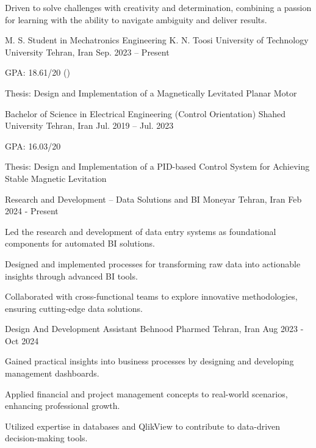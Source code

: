\documentclass[11pt, a4paper]{awesome-cv}
\begin{document}
	
	\makecvheader[C]
	
Driven to solve challenges with creativity and determination, combining a passion for learning with the ability to navigate ambiguity and deliver results.
	
\begin{cventries}
	\cventry
	{M. S. Student in Mechatronics Engineering} %
	{K. N. Toosi University of Technology University} %
	{Tehran, Iran} %
	{Sep. 2023 -- Present} %
	{
		\begin{cvitems} %
			\item {GPA: 18.61/20 ()}
			\item {Thesis: Design and Implementation of a Magnetically Levitated Planar Motor}
		\end{cvitems}
	}
	\cventry
	{Bachelor of Science in Electrical Engineering (Control Orientation)}
	{Shahed University}
	{Tehran, Iran}
	{Jul. 2019 -- Jul. 2023}
	{
		\begin{cvitems}
			\item {GPA: 16.03/20}
			\item {Thesis: Design and Implementation of a PID-based Control System for Achieving Stable Magnetic Levitation}
		\end{cvitems}
	}
	
	
		\cventry
	{Research and Development – Data Solutions and BI}
	{Moneyar}
	{Tehran, Iran}
	{Feb 2024 - Present}
	{
\begin{cvitems}
	\item {Led the research and development of data entry systems as foundational components for automated BI solutions.}
	\item {Designed and implemented processes for transforming raw data into actionable insights through advanced BI tools.}
	\item {Collaborated with cross-functional teams to explore innovative methodologies, ensuring cutting-edge data solutions.}
\end{cvitems}
	}
	
	
	\cventry
{Design And Development Assistant}
{Behnood Pharmed}
{Tehran, Iran}
{Aug 2023 - Oct 2024}
{
\begin{cvitems}
	\item {Gained practical insights into business processes by designing and developing management dashboards.}
	\item {Applied financial and project management concepts to real-world scenarios, enhancing professional growth.}
	\item {Utilized expertise in databases and QlikView to contribute to data-driven decision-making tools.}
\end{cvitems}
}


\end{cventries}
\end{document}
